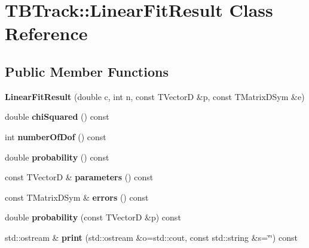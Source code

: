 \section{TBTrack::LinearFitResult Class Reference}
\label{classTBTrack_1_1LinearFitResult}
\subsection*{Public Member Functions}
\begin{DoxyCompactItemize}
\item 
{\bfseries LinearFitResult} (double c, int n, const TVectorD \&p, const TMatrixDSym \&e)\label{classTBTrack_1_1LinearFitResult_a3e4ba61e44c68bcf81db05f704d5d5b1}

\item 
double {\bfseries chiSquared} () const \label{classTBTrack_1_1LinearFitResult_a036042e6787c607d0ee51b20044d52b9}

\item 
int {\bfseries numberOfDof} () const \label{classTBTrack_1_1LinearFitResult_ab41a070ef6c6e60a04f44e1ad833caa3}

\item 
double {\bfseries probability} () const \label{classTBTrack_1_1LinearFitResult_a750253e1904b159bee301eceb5f09f80}

\item 
const TVectorD \& {\bfseries parameters} () const \label{classTBTrack_1_1LinearFitResult_ae0ed921b62f6653de3531a406335c7c2}

\item 
const TMatrixDSym \& {\bfseries errors} () const \label{classTBTrack_1_1LinearFitResult_aaef15bed0282bc3f5e8e2e59f0d611d6}

\item 
double {\bfseries probability} (const TVectorD \&p) const \label{classTBTrack_1_1LinearFitResult_a1fa9bf5b974dd4a0bc5d692c66bd820b}

\item 
std::ostream \& {\bfseries print} (std::ostream \&o=std::cout, const std::string \&s=\char`\"{}\char`\"{}) const \label{classTBTrack_1_1LinearFitResult_adafd249c515c0a59daa63513c7a5fb1c}

\end{DoxyCompactItemize}
